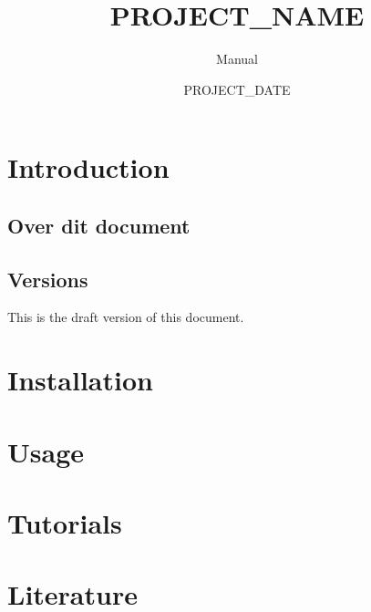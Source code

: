 \documentclass[signature]{deltares_manual}
\begin{document}
\pagestyle{empty}
\cleardoublepage
%
\newcommand{\ProgramName}{PROJECT_NAME\xspace}

\title{\ProgramName}
\subtitle{Manual}
\classification{-}

\date{PROJECT_DATE}



\summary{}

\authori{}
\revieweri{}
\approvali{}



\deltarestitle


\chapter{Introduction} 
\label{chapterIntroduction}

\section{Over dit document} \label{sec:PurposeAndScope}

\section{Versions}
\label{sec:Versions}
This is the draft version of this document.

\chapter{Installation}
\label{sec:Installation}

\chapter{Usage}
\label{sec:usage}

\chapter{Tutorials}
\label{sec:Tutorials}


\chapter{Literature}  \label{chapterLiterature}




\pagestyle{empty}
\mbox{}

\end{document}
